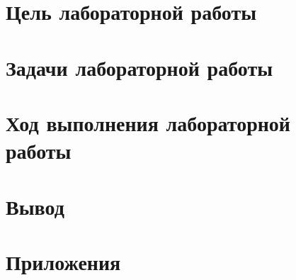 \documentclass[14pt]{extarticle}  %
\begin{document}
\newpage
{}

\section*{Цель лабораторной работы}


\vspace{0.5cm}

\section*{Задачи лабораторной работы}


\newpage
\section*{Ход выполнения лабораторной работы}
	
	
\newpage
\section*{Вывод}


\newpage
\section*{Приложения}

\end{document}
